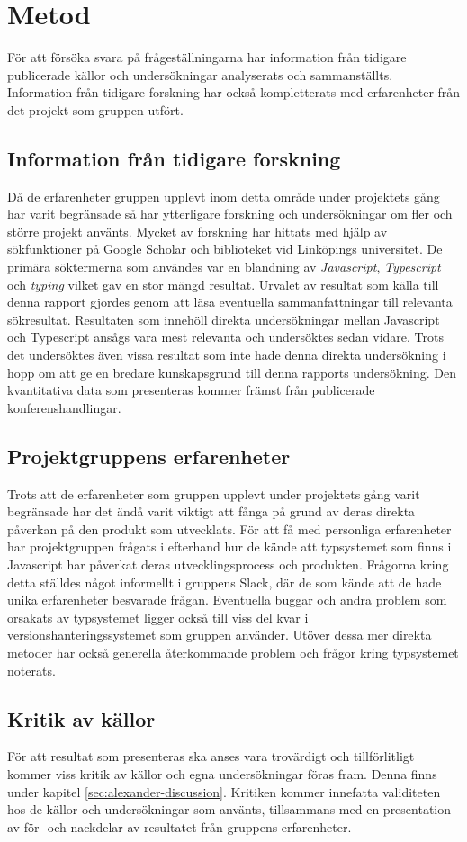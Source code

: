 \section{Metod}
\label{sec:alexander-method}

För att försöka svara på frågeställningarna har information från tidigare publicerade källor och undersökningar analyserats och sammanställts. Information från tidigare forskning har också kompletterats med erfarenheter från det projekt som gruppen utfört. 

\subsection{Information från tidigare forskning}

Då de erfarenheter gruppen upplevt inom detta område under projektets gång har varit begränsade så har ytterligare forskning och undersökningar om fler och större projekt använts. Mycket av forskning har hittats med hjälp av sökfunktioner på Google Scholar och biblioteket vid Linköpings universitet. De primära söktermerna som användes var en blandning av \textit{Javascript}, \textit{Typescript} och \textit{typing} vilket gav en stor mängd resultat. Urvalet av resultat som källa till denna rapport gjordes genom att läsa eventuella sammanfattningar till relevanta sökresultat. Resultaten som innehöll direkta undersökningar mellan Javascript och Typescript ansågs vara mest relevanta och undersöktes sedan vidare. Trots det undersöktes även vissa resultat som inte hade denna direkta undersökning i hopp om att ge en bredare kunskapsgrund till denna rapports undersökning. Den kvantitativa data som presenteras kommer främst från publicerade konferenshandlingar.

\subsection{Projektgruppens erfarenheter}
Trots att de erfarenheter som gruppen upplevt under projektets gång varit begränsade har det ändå varit viktigt att fånga på grund av deras direkta påverkan på den produkt som utvecklats. För att få med personliga erfarenheter har projektgruppen frågats i efterhand hur de kände att typsystemet som finns i Javascript har påverkat deras utvecklingsprocess och produkten. Frågorna kring detta ställdes något informellt i gruppens Slack, där de som kände att de hade unika erfarenheter besvarade frågan. Eventuella buggar och andra problem som orsakats av typsystemet ligger också till viss del kvar i versionshanteringssystemet som gruppen använder. Utöver dessa mer direkta metoder har också generella återkommande problem och frågor kring typsystemet noterats.

\subsection{Kritik av källor}
För att resultat som presenteras ska anses vara trovärdigt och tillförlitligt kommer viss kritik av källor och egna undersökningar föras fram. Denna finns under kapitel \ref{sec:alexander-discussion}. Kritiken kommer innefatta validiteten hos de källor och undersökningar som använts, tillsammans med en presentation av för- och nackdelar av resultatet från gruppens erfarenheter. 